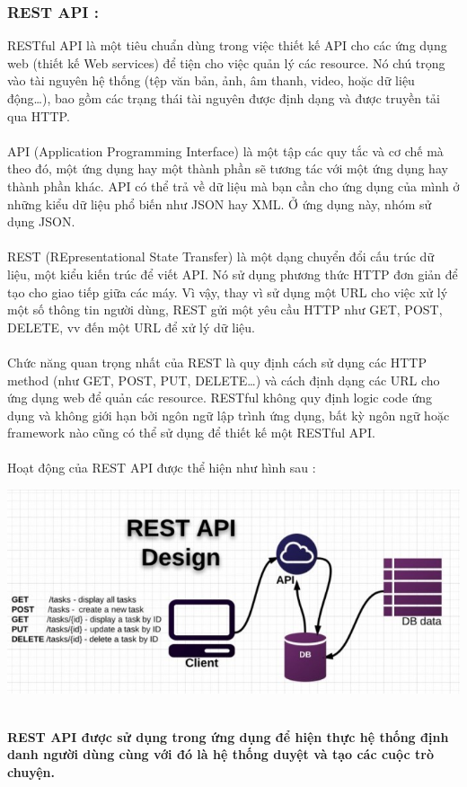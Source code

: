 \documentclass[a4paper]{article}
\begin{document}
		\subsubsection{REST API : }
		RESTful API là một tiêu chuẩn dùng trong việc thiết kế API cho các ứng dụng web (thiết kế Web services) để tiện cho việc quản lý các resource. Nó chú trọng vào tài nguyên hệ thống (tệp văn bản, ảnh, âm thanh, video, hoặc dữ liệu động…), bao gồm các trạng thái tài nguyên được định dạng và được truyền tải qua HTTP. \\\\
		API (Application Programming Interface) là một tập các quy tắc và cơ chế mà theo đó, một ứng dụng hay một thành phần sẽ tương tác với một ứng dụng hay thành phần khác. API có thể trả về dữ liệu mà bạn cần cho ứng dụng của mình ở những kiểu dữ liệu phổ biến như JSON hay XML. Ở ứng dụng này, nhóm sử dụng JSON. \\\\
		REST (REpresentational State Transfer) là một dạng chuyển đổi cấu trúc dữ liệu, một kiểu kiến trúc để viết API. Nó sử dụng phương thức HTTP đơn giản để tạo cho giao tiếp giữa các máy. Vì vậy, thay vì sử dụng một URL cho việc xử lý một số thông tin người dùng, REST gửi một yêu cầu HTTP như GET, POST, DELETE, vv đến một URL để xử lý dữ liệu.\\\\
		Chức năng quan trọng nhất của REST là quy định cách sử dụng các HTTP method (như GET, POST, PUT, DELETE…) và cách định dạng các URL cho ứng dụng web để quản các resource. RESTful không quy định logic code ứng dụng và không giới hạn bởi ngôn ngữ lập trình ứng dụng, bất kỳ ngôn ngữ hoặc framework nào cũng có thể sử dụng để thiết kế một RESTful API.\\\\	
		Hoạt động của REST API được thể hiện như hình sau :
			\begin{center}
				\includegraphics[scale=0.7]{Images/restfulapi.jpg}
			\end{center}
		\text{}\\
		\textbf{REST API được sử dụng trong ứng dụng để hiện thực hệ thống định danh người dùng cùng với đó là hệ thống duyệt và tạo các cuộc trò chuyện.}\\
		
\end{document}
